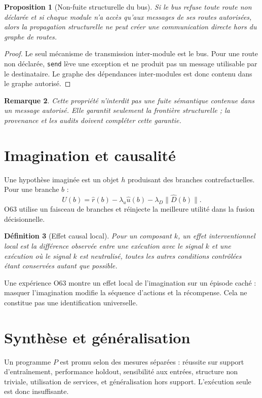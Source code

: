 \documentclass[11pt,a4paper]{article}
\newtheorem{definition}{Définition}[section]
\newtheorem{proposition}[definition]{Proposition}
\newtheorem{remark}[definition]{Remarque}
\newcommand{\code}[1]{\texttt{#1}}
\begin{document}
\begin{proposition}[Non-fuite structurelle du bus]
Si le bus refuse toute route non déclarée et si chaque module n’a accès qu’aux messages de ses routes autorisées, alors la propagation structurelle ne peut créer une communication directe hors du graphe de routes.
\end{proposition}

\begin{proof}
Le seul mécanisme de transmission inter-module est le bus. Pour une route non déclarée, \code{send} lève une exception et ne produit pas un message utilisable par le destinataire. Le graphe des dépendances inter-modules est donc contenu dans le graphe autorisé.
\end{proof}

\begin{remark}
Cette propriété n’interdit pas une fuite sémantique contenue dans un message autorisé. Elle garantit seulement la frontière structurelle ; la provenance et les audits doivent compléter cette garantie.
\end{remark}

\section{Imagination et causalité}
Une hypothèse imaginée est un objet $h$ produisant des branches contrefactuelles. Pour une branche $b$ :
\[
U(b)=\hat r(b)-\lambda_u\hat u(b)-\lambda_D\|\hat D(b)\|.
\]
O63 utilise un faisceau de branches et réinjecte la meilleure utilité dans la fusion décisionnelle.

\begin{definition}[Effet causal local]
Pour un composant $k$, un effet interventionnel local est la différence observée entre une exécution avec le signal $k$ et une exécution où le signal $k$ est neutralisé, toutes les autres conditions contrôlées étant conservées autant que possible.
\end{definition}

Une expérience O63 montre un effet local de l’imagination sur un épisode caché : masquer l’imagination modifie la séquence d’actions et la récompense. Cela ne constitue pas une identification universelle.

\section{Synthèse et généralisation}
Un programme $P$ est promu selon des mesures séparées : réussite sur support d’entraînement, performance holdout, sensibilité aux entrées, structure non triviale, utilisation de services, et généralisation hors support. L’exécution seule est donc insuffisante.
\end{document}
